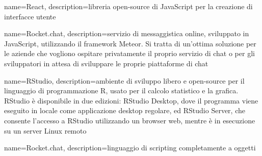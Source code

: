 
{
	name=React,
	description={libreria open-source di JavaScript per la creazione di interfacce utente}
}

{
	name=Rocket.chat,
	description={servizio di messaggistica online, sviluppato in JavaScript, utilizzando il framework Meteor. Si tratta di un'ottima soluzione per le aziende che vogliono ospitare privatamente il proprio servizio di chat o per gli sviluppatori in attesa di sviluppare le proprie piattaforme di chat}
}

{
	name=RStudio,
	description={ambiente di sviluppo libero e open-source per il linguaggio di programmazione R, usato per il calcolo statistico e la grafica. RStudio è disponibile in due edizioni: RStudio Desktop, dove il programma viene eseguito in locale come applicazione desktop regolare, ed RStudio Server, che consente l'accesso a RStudio utilizzando un browser web, mentre è in esecuzione su un server Linux remoto}
}

{
	name=Rocket.chat,
	description={linguaggio di scripting completamente a oggetti}
}